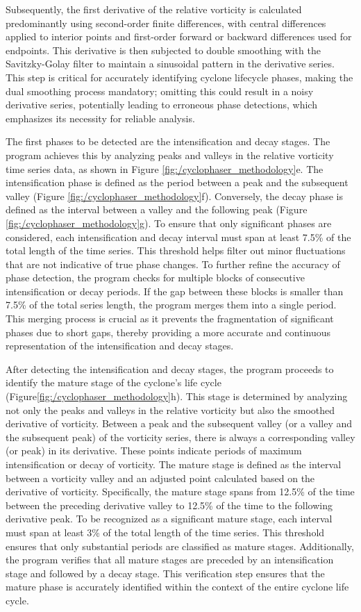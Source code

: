 Subsequently, the first derivative of the relative vorticity is calculated predominantly using second-order finite differences, with central differences applied to interior points and first-order forward or backward differences used for endpoints. This derivative is then subjected to double smoothing with the Savitzky-Golay filter to maintain a sinusoidal pattern in the derivative series. This step is critical for accurately identifying cyclone lifecycle phases, making the dual smoothing process mandatory; omitting this could result in a noisy derivative series, potentially leading to erroneous phase detections, which emphasizes its necessity for reliable analysis.

The first phases to be detected are the intensification and decay stages. The program achieves this by analyzing peaks and valleys in the relative vorticity time series data, as shown in Figure \ref{fig:/cyclophaser_methodology}e. The intensification phase is defined as the period between a peak and the subsequent valley (Figure \ref{fig:/cyclophaser_methodology}f). Conversely, the decay phase is defined as the interval between a valley and the following peak (Figure \ref{fig:/cyclophaser_methodology}g). To ensure that only significant phases are considered, each intensification and decay interval must span at least 7.5\% of the total length of the time series. This threshold helps filter out minor fluctuations that are not indicative of true phase changes. To further refine the accuracy of phase detection, the program checks for multiple blocks of consecutive intensification or decay periods. If the gap between these blocks is smaller than 7.5\% of the total series length, the program merges them into a single period. This merging process is crucial as it prevents the fragmentation of significant phases due to short gaps, thereby providing a more accurate and continuous representation of the intensification and decay stages.

After detecting the intensification and decay stages, the program proceeds to identify the mature stage of the cyclone's life cycle (Figure\ref{fig:/cyclophaser_methodology}h). This stage is determined by analyzing not only the peaks and valleys in the relative vorticity but also the smoothed derivative of vorticity. Between a peak and the subsequent valley (or a valley and the subsequent peak) of the vorticity series, there is always a corresponding valley (or peak) in its derivative. These points indicate periods of maximum intensification or decay of vorticity. The mature stage is defined as the interval between a vorticity valley and an adjusted point calculated based on the derivative of vorticity. Specifically, the mature stage spans from 12.5\% of the time between the preceding derivative valley to 12.5\% of the time to the following derivative peak. To be recognized as a significant mature stage, each interval must span at least 3\% of the total length of the time series. This threshold ensures that only substantial periods are classified as mature stages. Additionally, the program verifies that all mature stages are preceded by an intensification stage and followed by a decay stage. This verification step ensures that the mature phase is accurately identified within the context of the entire cyclone life cycle.

